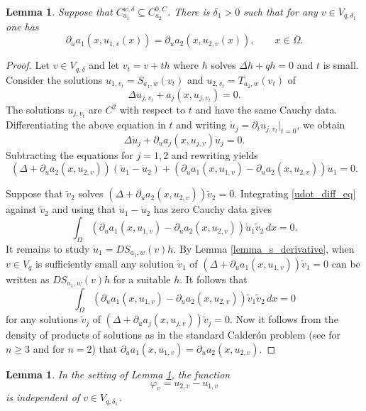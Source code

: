 \documentclass[11pt,a4paper]{amsart}
\newtheorem{Lemma}[Theorem]{Lemma}
\theoremstyle{definition}
\numberwithin{equation}{section}
\newcommand{\ol}[1]{\overline{#1}}
\newcommand{\p}{\partial}
\newcommand{\Om}{\Omega}
\begin{document}
\begin{Lemma}\label{lemma_first_lin}
Suppose that $C_{a_1}^{w,\delta} \subseteq C_{a_2}^{0,C}$. There is $\delta_1 > 0$ such that for any $v \in V_{q,\delta_1}$ one has 
\[
\p_u a_1(x, u_{1,v}(x)) = \p_u a_2(x, u_{2,v}(x)), \qquad x \in \ol{\Om}.
\]
\end{Lemma}
\begin{proof}
Let $v \in V_{q,\delta}$ and let $v_t = v + th$ where $h$ solves $\Delta h + qh = 0$ and $t$ is small. Consider the solutions $u_{1,v_t} = S_{a_1,w}(v_t)$ and $u_{2,v_t} = T_{a_2,w}(v_t)$ of 
\[
\Delta u_{j,v_t} + a_j(x,u_{j,v_t}) = 0.
\]
The solutions $u_{j,v_t}$ are $C^2$ with respect to $t$ and have the same Cauchy data. Differentiating the above equation in $t$ and writing $\dot{u}_j = \p_t u_{j,v_t}|_{t=0}$, we obtain 
\[
\Delta \dot{u}_j + \p_u a_j(x, u_{j,v}) \dot{u}_j = 0.
\]
Subtracting the equations for $j=1, 2$ and rewriting yields 
\begin{equation} \label{udot_diff_eq}
(\Delta + \p_u a_2(x,u_{2,v}))(\dot{u}_1-\dot{u}_2) + (\p_u a_1(x,u_{1,v}) - \p_u a_2(x,u_{2,v})) \dot{u}_1 = 0.
\end{equation}

Suppose that $\tilde{v}_2$ solves $(\Delta + \p_u a_2(x,u_{2,v})) \tilde{v}_2 = 0$. Integrating \eqref{udot_diff_eq} against $\tilde{v}_2$ and using that $\dot{u}_1-\dot{u}_2$ has zero Cauchy data gives 
\[
\int_{\Om} (\p_u a_1(x,u_{1,v}) - \p_u a_2(x,u_{2,v})) \dot{u}_1 \tilde{v}_2 \,dx = 0.
\]
It remains to study $\dot{u}_1 = D S_{a_1,w}(v)h$. By Lemma \ref{lemma_s_derivative}, when $v \in V_q$ is sufficiently small any solution $\tilde{v}_1$ of $(\Delta + \p_u a_1(x,u_{1,v})) \tilde{v}_1 = 0$ can be written as $D S_{a_1,w}(v)h$ for a suitable $h$. It follows that 
\[
\int_{\Om} (\p_u a_1(x,u_{1,v}) - \p_u a_2(x,u_{2,v})) \tilde{v}_1 \tilde{v}_2 \,dx = 0
\]
for any solutions $\tilde{v}_j$ of $(\Delta + \p_u a_j(x,u_{j,v})) \tilde{v}_j = 0$. Now it follows from the density of products of solutions as in the standard Calderón problem (see \cite{SylvesterUhlmann} for $n \geq 3$ and \cites{Bukhgeim, btw20} for $n=2$) that \( \partial_{u}a_{1}(x,u_{1,v}) = \partial_{u}a_{2}(x,u_{2,v}) \).
\end{proof}

\begin{Lemma}\label{lemma_first_lin_varphi}
In the setting of Lemma \ref{lemma_first_lin}, the function 
\[
\varphi_v = u_{2,v} - u_{1,v}
\]
is independent of $v \in V_{q,\delta_1}$.
\end{Lemma}
\end{document}
